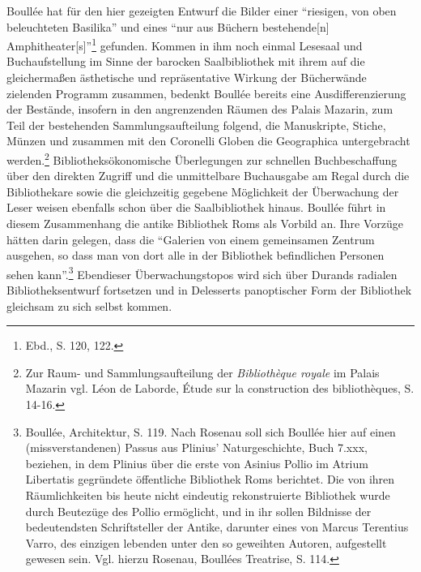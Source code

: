 Boullée hat für den hier gezeigten Entwurf die Bilder einer
\enquote{riesigen, von oben beleuchteten Basilika} und eines
\enquote{nur aus Büchern bestehende{[}n{]}
Amphitheater{[}s{]}}\footnote{Ebd., S. 120, 122.} gefunden. Kommen in
ihm noch einmal Lesesaal und Buchaufstellung im Sinne der barocken
Saalbibliothek mit ihrem auf die gleichermaßen ästhetische und
repräsentative Wirkung der Bücherwände zielenden Programm zusammen,
bedenkt Boullée bereits eine Ausdifferenzierung der Bestände, insofern
in den angrenzenden Räumen des Palais Mazarin, zum Teil der bestehenden
Sammlungsaufteilung folgend, die Manuskripte, Stiche, Münzen und
zusammen mit den Coronelli Globen die Geographica untergebracht
werden.\footnote{Zur Raum- und Sammlungsaufteilung der
  \emph{Bibliothèque royale} im Palais Mazarin vgl. Léon de Laborde,
  Étude sur la construction des bibliothèques, S. 14-16.}
Bibliotheksökonomische Überlegungen zur schnellen Buchbeschaffung über
den direkten Zugriff und die unmittelbare Buchausgabe am Regal durch die
Bibliothekare sowie die gleichzeitig gegebene Möglichkeit der
Überwachung der Leser weisen ebenfalls schon über die Saalbibliothek
hinaus. Boullée führt in diesem Zusammenhang die antike Bibliothek Roms
als Vorbild an. Ihre Vorzüge hätten darin gelegen, dass die
\enquote{Galerien von einem gemeinsamen Zentrum ausgehen, so dass man
von dort alle in der Bibliothek befindlichen Personen sehen
kann}.\footnote{Boullée, Architektur, S. 119. Nach Rosenau soll sich
  Boullée hier auf einen (missverstandenen) Passus aus Plinius'
  Naturgeschichte, Buch 7.xxx, beziehen, in dem Plinius über die erste
  von Asinius Pollio im Atrium Libertatis gegründete öffentliche
  Bibliothek Roms berichtet. Die von ihren Räumlichkeiten bis heute
  nicht eindeutig rekonstruierte Bibliothek wurde durch Beutezüge des
  Pollio ermöglicht, und in ihr sollen Bildnisse der bedeutendsten
  Schriftsteller der Antike, darunter eines von Marcus Terentius Varro,
  des einzigen lebenden unter den so geweihten Autoren, aufgestellt
  gewesen sein. Vgl. hierzu Rosenau, Boullées Treatrise, S. 114.}
Ebendieser Überwachungstopos wird sich über Durands radialen
Bibliotheksentwurf fortsetzen und in Delesserts panoptischer Form der
Bibliothek gleichsam zu sich selbst kommen.

